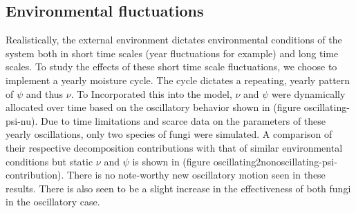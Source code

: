 \documentclass[10pt]{article}
\begin{document}
\subsection*{Environmental fluctuations}
Realistically, the external environment dictates environmental conditions of the system both in short time scales (year fluctuations for example) and long time scales. To study the effects of these short time scale fluctuations, we choose to implement a yearly moisture cycle. The cycle dictates a repeating, yearly pattern of $\psi$ and thus $\nu$. To Incorporated this into the model, $\nu$ and $\psi$ were dynamically allocated over time based on the oscillatory behavior shown in (figure oscillating-psi-nu). Due to time limitations and scarce data on the parameters of these yearly oscillations, only two species of fungi were simulated. A comparison of their respective decomposition contributions with that of similar environmental conditions but static $\nu$ and $\psi$ is shown in (figure oscillating2nonoscillating-psi-contribution). There is no note-worthy new oscillatory motion seen in these results. There is also seen to be a slight increase in the effectiveness of both fungi in the oscillatory case. 
\end{document}
